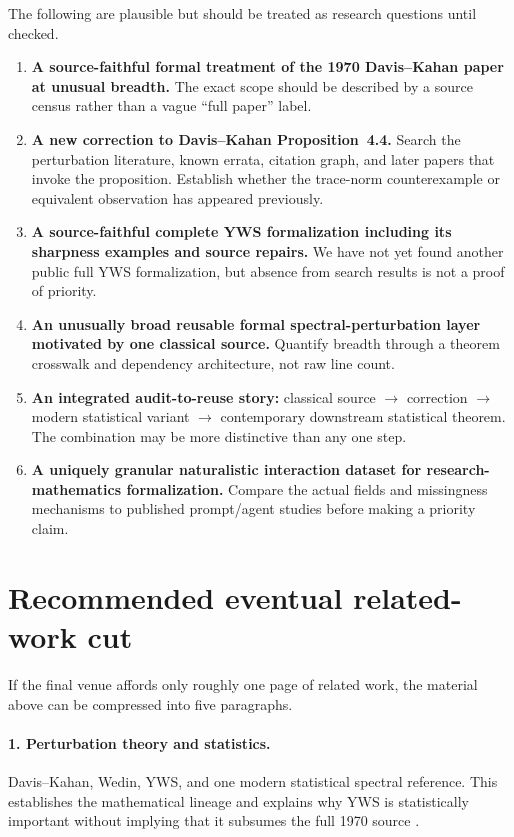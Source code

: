 \documentclass[11pt]{article}
\begin{document}
The following are plausible but should be treated as research questions until
checked.

\begin{enumerate}
  \item \textbf{A source-faithful formal treatment of the 1970 Davis--Kahan
        paper at unusual breadth.}  The exact scope should be described by a
        source census rather than a vague ``full paper'' label.
  \item \textbf{A new correction to Davis--Kahan Proposition~4.4.}  Search the
        perturbation literature, known errata, citation graph, and later papers
        that invoke the proposition.  Establish whether the trace-norm
        counterexample or equivalent observation has appeared previously.
  \item \textbf{A source-faithful complete YWS formalization including its
        sharpness examples and source repairs.}  We have not yet found another
        public full YWS formalization, but absence from search results is not a
        proof of priority.
  \item \textbf{An unusually broad reusable formal spectral-perturbation layer
        motivated by one classical source.}  Quantify breadth through a theorem
        crosswalk and dependency architecture, not raw line count.
  \item \textbf{An integrated audit-to-reuse story:} classical source
        $\rightarrow$ correction $\rightarrow$ modern statistical variant
        $\rightarrow$ contemporary downstream statistical theorem.  The
        combination may be more distinctive than any one step.
  \item \textbf{A uniquely granular naturalistic interaction dataset for
        research-mathematics formalization.}  Compare the actual fields and
        missingness mechanisms to published prompt/agent studies before making a
        priority claim.
\end{enumerate}

\section{Recommended eventual related-work cut}
\label{sec:recommended-cut}

If the final venue affords only roughly one page of related work, the material
above can be compressed into five paragraphs.

\paragraph{1. Perturbation theory and statistics.}
Davis--Kahan, Wedin, YWS, and one modern statistical spectral reference.  This
establishes the mathematical lineage and explains why YWS is statistically
important without implying that it subsumes the full 1970 source
\citep{davis1970rotation,wedin1972perturbation,yu2015davis,chen2021spectral}.
\end{document}
